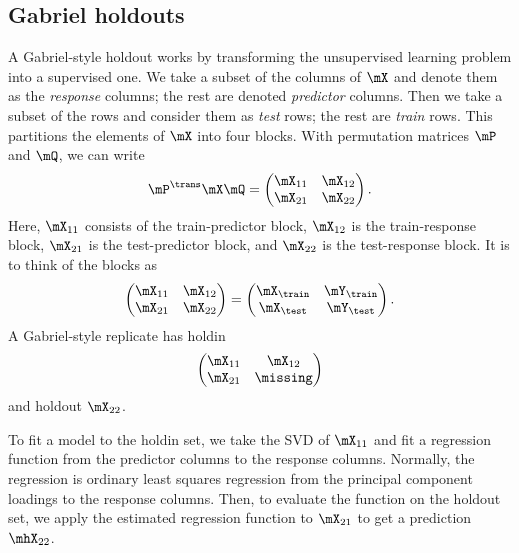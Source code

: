 \subsection{Gabriel holdouts}

A Gabriel-style holdout works by transforming the unsupervised learning
problem into a supervised one. We take a subset of the columns of $\mX$ and
denote them as the \emph{response} columns; the rest are denoted
\emph{predictor} columns. Then we take a subset of the rows and consider them
as \emph{test} rows; the rest are \emph{train} rows. This partitions the
elements of $\mX$ into four blocks. With permutation matrices $\mP$ and $\mQ$,
we can write
\[
    \mP^\trans \mX \mQ
        =
        \left(
        \begin{matrix}
           \mX_{11} & \mX_{12} \\
           \mX_{21} & \mX_{22}
        \end{matrix}
        \right).
\]
Here, $\mX_{11}$ consists of the train-predictor block, $\mX_{12}$ is the train-response block, $\mX_{21}$ is the test-predictor block, and $\mX_{22}$ is the test-response block.  It is to think of the blocks as
\[
    \left(
    \begin{matrix}
       \mX_{11} & \mX_{12} \\
       \mX_{21} & \mX_{22}
    \end{matrix}
    \right)
        =
        \left(
        \begin{matrix}
           \mX_\train & \mY_\train \\
           \mX_\test  & \mY_\test 
        \end{matrix}
        \right).
\]
A Gabriel-style replicate has holdin
\[
\left(
    \begin{matrix}
       \mX_{11} & \mX_{12} \\
       \mX_{21} & \missing
    \end{matrix}
    \right)
\]
and holdout $\mX_{22}$.

To fit a model to the holdin set, we take the SVD of $\mX_{11}$ and fit a 
regression function from the predictor columns to the response columns.  
Normally, the regression is ordinary least squares regression from the 
principal component loadings to the response columns.  Then, to evaluate the 
function on the holdout set, we apply the estimated regression function to 
$\mX_{21}$ to get a prediction $\mhX_{22}$.

